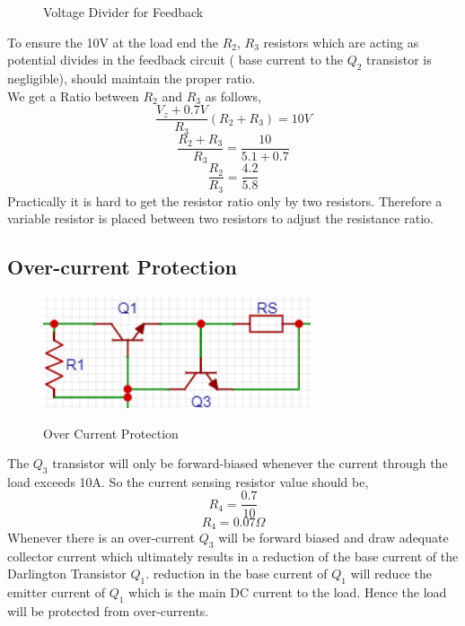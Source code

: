 \documentclass[11pt]{article}
\begin{document}
\begin{multicols}{2}
\begin{figure}[H]
   \caption{Voltage Divider for Feedback}
\end{figure}
To ensure the 10V at the load end the $R_2$, $R_3$ resistors which are acting as potential divides in the feedback circuit ( base current to the $Q_2$ transistor is negligible), should maintain the proper ratio.\\
We get a Ratio between $R_2$ and $R_3$ as follows,\\
$$\frac{V_z + 0.7V}{R_3}(R_2+R_3) = 10V$$
$$\frac{R_2 + R_3}{R_3} =\frac{10}{5.1+0.7}$$
$$\frac{R_2}{R_3} = \frac{4.2}{5.8}$$
Practically it is hard to get the resistor ratio only by two resistors. Therefore a variable resistor is placed between two resistors to adjust the resistance ratio.
\subsection{Over-current Protection}
\begin{figure}[H]
   \centering
   \includegraphics[height=1.3in]{Current Sensing.png}\\
   \caption{Over Current Protection}
\end{figure}
The $Q_3$ transistor will only be forward-biased whenever the current through the load exceeds 10A. So the current sensing resistor value should be,
$$R_4 = \frac{0.7}{10}$$
$$R_4 = 0.07\Omega$$
Whenever there is an over-current $Q_3$ will be forward biased and draw adequate collector current which ultimately results in a reduction of the base current of the Darlington Transistor $Q_1$. reduction in the base current of $Q_1$ will reduce the emitter current of $Q_1$ which is the main DC current to the load. Hence the load will be protected from over-currents.

\end{multicols}
\end{document}
